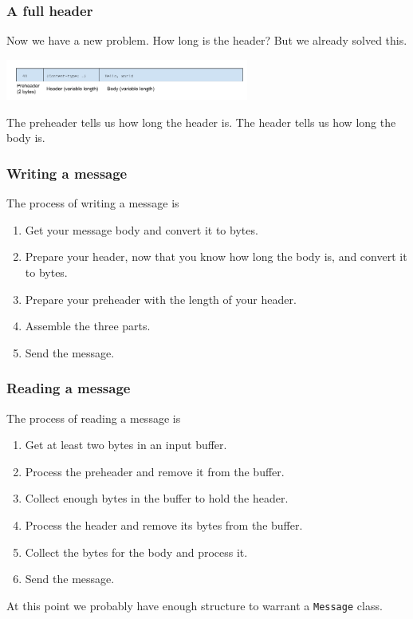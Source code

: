 \documentclass[10pt]{beamer}
\begin{document}
\begin{frame}
  \frametitle{A full header}
  
  Now we have a new problem. How long is the header? But we already solved this.
  
  \includegraphics[width=8cm]{message2.png}
  
  The preheader tells us how long the header is. The header tells us how
  long the body is. 
 
  \end{frame}


\begin{frame}
  \frametitle{Writing a message}
  
  The process of writing a message is
  \begin{enumerate}
    \item Get your message body and convert it to bytes.
    \item Prepare your header, now that you know how long the body is, and convert it to bytes.
    \item Prepare your preheader with the length of your header.
    \item Assemble the three parts.
    \item Send the message.
  \end{enumerate}      
\end{frame}
\begin{frame}
  \frametitle{Reading a message}
  
  The process of reading a message is
  \begin{enumerate}
    \item Get at least two bytes in an input buffer.
    \item Process the preheader and remove it from the buffer.
    \item Collect enough bytes in the buffer to hold the header.
    \item Process the header and remove its bytes from the buffer.
    \item Collect the bytes for the body and process it.
    \item Send the message.
  \end{enumerate}
  
  At this point we probably have enough structure to warrant a \texttt{Message} class.      
\end{frame}
\end{document}
